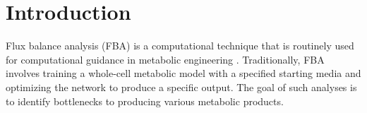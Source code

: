\documentclass[12pt]{article}
\begin{document}
\section*{Introduction}
Flux balance analysis (FBA) is a computational technique that is routinely used for computational guidance in metabolic engineering \cite{Orthetal2010}. Traditionally, FBA involves training a whole-cell metabolic model with a specified starting media and optimizing the network to produce a specific output. The goal of such analyses is to identify bottlenecks to producing various metabolic products. 




\end{document}
